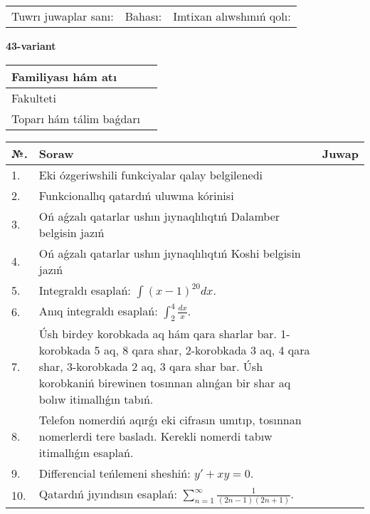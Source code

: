 \documentclass{article}
\begin{document}
\vspace{1cm}

\begin{tabular}{ c c c }
Tuwrı juwaplar sanı: \underline{\hspace{2cm}} & Bahası: \underline{\hspace{2cm}} & Imtixan alıwshınıń qolı: \underline{\hspace{2cm}} \\
\end{tabular}

\newpage

\begin{center}\textbf{43-variant}\end{center}

\bgroup
\def\arraystretch{1.5}
\begin{tabular}{ |m{6cm}|m{10cm}| }
  \hline
  Familiyası hám atı & \\
  \hline
  Fakulteti &\\
  \hline
  Toparı hám tálim baǵdarı & \\
  \hline
\end{tabular}
\egroup

\vspace{0.5cm}

\bgroup
\def\arraystretch{2}
\begin{tabular}{ |l|m{8cm}|m{7cm}| }
  \hline
  №. & Soraw & Juwap \\
  \hline
  1. & Eki ózgeriwshili funkciyalar qalay belgilenedi &  \\
  \hline
  2. & Funkcionallıq qatardıń uluwma kórinisi &  \\
  \hline
  3. & Oń aǵzalı qatarlar ushın jıynaqlılıqtıń Dalamber belgisin jazıń &  \\
  \hline
  4. & Oń aǵzalı qatarlar ushın jıynaqlılıqtıń Koshi belgisin jazıń &  \\
  \hline
  5. & Integraldı esaplań: $\displaystyle\int (x - 1)^{20}dx$. &  \\
  \hline
  6. & Anıq integraldı esaplań: $\displaystyle\int_{2}^{4}\frac{dx}{x}$. &  \\
  \hline
  7. & Úsh birdey korobkada aq hám qara sharlar bar. 1-korobkada 5 aq, 8 qara shar, 2-korobkada 3 aq, 4 qara shar, 3-korobkada 2 aq, 3 qara shar bar. Úsh korobkaniń birewinen tosınnan alınǵan bir shar aq bolıw itimallıǵın tabıń. &  \\
  \hline
  8. & Telefon nomerdiń aqırǵı eki cifrasın umıtıp, tosınnan nomerlerdi tere basladı. Kerekli nomerdi tabıw itimallıǵın esaplań. &  \\
  \hline
  9. & Differencial teńlemeni sheshiń: $y' + xy = 0$. &  \\
  \hline
  10. & Qatardıń jıyındısın esaplań: $\displaystyle\sum_{n = 1}^{\infty}\frac{1}{(2n - 1)(2n + 1)}$. &  \\
  \hline
\end{tabular}
\egroup
\end{document}
